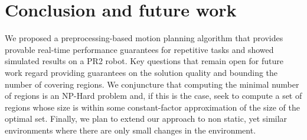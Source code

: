 \documentclass[letterpaper]{article} %
\begin{document}
\section{Conclusion and future work}
We proposed a preprocessing-based motion planning algorithm that provides provable real-time performance guarantees for repetitive tasks and showed simulated results on a PR2 robot. 
Key questions that remain open for future work regard providing guarantees on the solution quality and bounding the number of covering regions.
We conjuncture that computing the minimal number of regions is an \textsf{NP-Hard} problem and, if this is the case, seek to compute a set of regions whose size is within some constant-factor approximation of  the size of the optimal set.
Finally, we plan to extend our approach to non static, yet similar environments where there are only small changes in the environment. 


\end{document}
